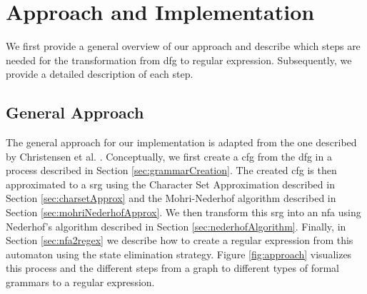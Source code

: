 \chapter{Approach and Implementation}
\label{chapter:Approach}


We first provide a general overview of our approach and describe which steps are needed for the transformation from \ac{dfg} to regular expression. Subsequently, we provide a detailed description of each step.


\section{General Approach}

The general approach for our implementation is adapted from the one described by Christensen et al. \cite{brics}. Conceptually, we first create a \acf{cfg} from the \ac{dfg} in a process described in Section \ref{sec:grammarCreation}.
The created \ac{cfg} is then approximated to a \acf{srg} using the Character Set Approximation described in Section \ref{sec:charsetApprox} and the Mohri-Nederhof algorithm described in Section \ref{sec:mohriNederhofApprox}. We then transform this \ac{srg} into an \acf{nfa} using Nederhof's algorithm described in Section \ref{sec:nederhofAlgorithm}. Finally, in Section \ref{sec:nfa2regex} we describe how to create a regular expression from this automaton using the state elimination strategy. Figure \ref{fig:approach} visualizes this process and the different steps from a graph to different types of formal grammars to a regular expression.



